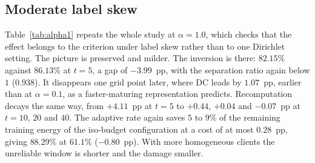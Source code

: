 \documentclass[conference]{IEEEtran}
\begin{document}
\subsection{Moderate label skew}

Table~\ref{tab:alpha1} repeats the whole study at $\alpha=1.0$, which checks that the
effect belongs to the criterion under label skew rather than to one Dirichlet setting.
The picture is preserved and milder. The inversion is there: $82.15\%$ against
$86.13\%$ at $t=5$, a gap of $-3.99$~pp, with the separation ratio again below $1$
($0.938$). It disappears one grid point later, where DC leads by $1.07$~pp, earlier
than at $\alpha=0.1$, as a faster-maturing representation predicts. Recomputation
decays the same way, from $+4.11$~pp at $t=5$ to $+0.44$, $+0.04$ and $-0.07$~pp at
$t=10$, $20$ and $40$. The adaptive rate again saves $5$ to $9\%$ of the remaining
training energy of the iso-budget configuration at a cost of at most $0.28$~pp, giving
$88.29\%$ at $61.1\%$ ($-0.80$~pp). With more homogeneous clients the unreliable
window is shorter and the damage smaller.
\end{document}
